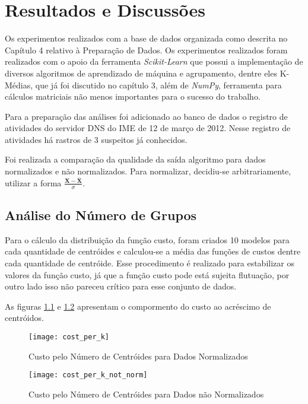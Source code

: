\chapter{Resultados e Discussões}

Os experimentos realizados com a base de dados organizada como descrita no Capítulo 4 relativo à Preparação de Dados. Os experimentos realizados foram realizados com o apoio da ferramenta \textit{Scikit-Learn} que possui a implementação de diversos algoritmos de aprendizado de máquina e agrupamento, dentre eles K-Médias, que já foi discutido no capítulo 3, além de \textit{NumPy}, ferramenta para cálculos matriciais não menos importantes para o sucesso do trabalho.

Para a preparação das análises foi adicionado ao banco de dados o registro de atividades do servidor DNS do IME de 12 de março de 2012. Nesse registro de atividades há rastros de 3 suspeitos já conhecidos.

Foi realizada a comparação da qualidade da saída algoritmo para dados normalizados e não normalizados. Para normalizar, decidiu-se arbitrariamente, utilizar a forma \(\frac{\mathbf{X} - \mathbf{\bar{X}}}{\sigma} \).

\section{Análise do Número de Grupos}

Para o cálculo da distribuição da função custo, foram criados 10 modelos para cada quantidade de centróides e calculou-se a média das funções de custos dentre cada quantidade de centróide. Esse procedimento é realizado para estabilizar os valores da função custo, já que a função custo pode está sujeita flutuação, por outro lado isso não pareceu crítico para esse conjunto de dados.

As figuras \ref{fig:cost_per_k} e \ref{fig:cost_per_k_not_norm} apresentam o compormento do custo ao acréscimo de centróidos.

\begin{figure}[htbp]
\centering
\texttt{[image: cost\_per\_k]}
\caption[Custo pelo Número de Centróides para Dados Normalizados]{Custo pelo Número de Centróides para Dados Normalizados} \label{fig:cost_per_k}
\end{figure}

\begin{figure}[htbp]
\centering
\texttt{[image: cost\_per\_k\_not\_norm]}
\caption[Custo pelo Número de Centróides para Dados não Normalizados]{Custo pelo Número de Centróides para Dados não Normalizados} \label{fig:cost_per_k_not_norm}
\end{figure}

